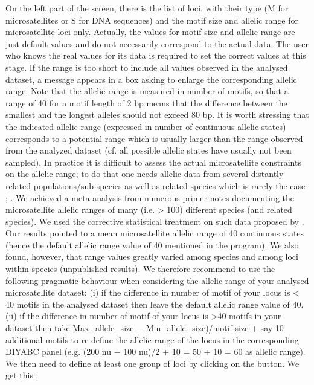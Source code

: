 On the left part of the screen, there is the list of loci, with their
type (M for microsatellites or S for DNA sequences) and the motif
size and allelic range for microsatellite loci only. Actually, the
values for motif size and allelic range are just default values and
do not necessarily correspond to the actual data. The user who knows
the real values for its data is required to set the correct values
at this stage. If the range is too short to include all values observed
in the analysed dataset, a message appears in a box asking to enlarge
the corresponding allelic range. Note that the allelic range is measured
in number of motifs, so that a range of 40 for a motif length of 2
bp means that the difference between the smallest and the longest
alleles should not exceed 80 bp. It is worth stressing that the indicated
allelic range (expressed in number of continuous allelic states) corresponds
to a potential range which is usually larger than the range observed
from the analyzed dataset (cf. all possible allelic states have usually
not been sampled). In practice it is difficult to assess the actual
microsatellite constraints on the allelic range; to do that one needs
allelic data from several distantly related populations/sub-species
as well as related species which is rarely the case \citep[see][]{PDD1998};
\citep{E2002}. We achieved a meta-analysis from numerous primer notes
documenting the microsatellite allelic ranges of many (i.e. \textgreater
100) different species (and related species). We used the corrective
statistical treatment on such data proposed by \citep{PDD1998}. Our
results pointed to a mean microsatellite allelic range of 40 continuous
states (hence the default allelic range value of 40 mentioned in the
program). We also found, however, that range values greatly varied
among species and among loci within species (unpublished results).
We therefore recommend to use the following pragmatic behaviour when
considering the allelic range of your analysed microsatellite dataset:
(i) if the difference in number of motif of your locus is \textless
40 motifs in the analysed dataset then leave the default allelic range
value of 40. (ii) if the difference in number of motif of your locus
is \textgreater 40 motifs in your dataset then take Max\_allele\_size
$-$ Min\_allele\_size)/motif size + say 10 additional motifs to re-define
the allelic range of the locus in the corresponding DIYABC panel (e.g.
(200 nu $-$ 100 nu)/2 + 10 = 50 + 10 = 60 as allelic range).\\
 We then need to define at least one group of loci by clicking on
the  button. We get this :\\


